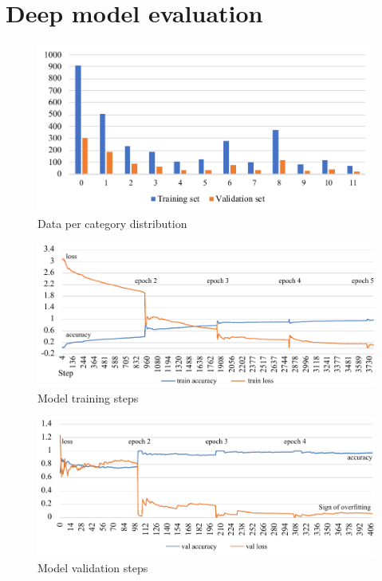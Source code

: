 \section{Deep model evaluation}
\label{sec:Deep model evaluation}

\begin{figure}[!ht]
    \centering
    \includegraphics[width=\textwidth]{evaluation/imgs/5-data-dist-diag.pdf}
    \caption{Data per category distribution}
    \label{fig:5-data-dist-diag}
\end{figure}

\begin{figure}[!ht]
    \centering
    \includegraphics[width=\textwidth]{evaluation/imgs/5-train-step.pdf}
    \caption{Model training steps}
    \label{fig:5-train-step}
\end{figure}

\begin{figure}[!ht]
    \centering
    \includegraphics[width=\textwidth]{evaluation/imgs/5-val-steps.pdf}
    \caption{Model validation steps}
    \label{fig:5-val-steps}
\end{figure}

